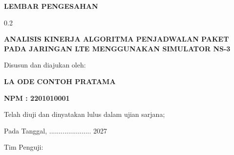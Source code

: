 \thispagestyle{empty}
\begin{tengah}
\textbf{LEMBAR PENGESAHAN}
\end{tengah}
\begin{ruang}{0.2}\end{ruang}
\begin{tengah}
\textbf{ANALISIS KINERJA ALGORITMA PENJADWALAN PAKET PADA JARINGAN LTE MENGGUNAKAN SIMULATOR NS-3}

Disusun dan diajukan oleh:

\textbf{LA ODE CONTOH PRATAMA}

\textbf{NPM : 2201010001}

Telah diuji dan dinyatakan lulus dalam ujian sarjana;

Pada Tanggal, ...................... 2027

Tim Penguji:
\end{tengah}
